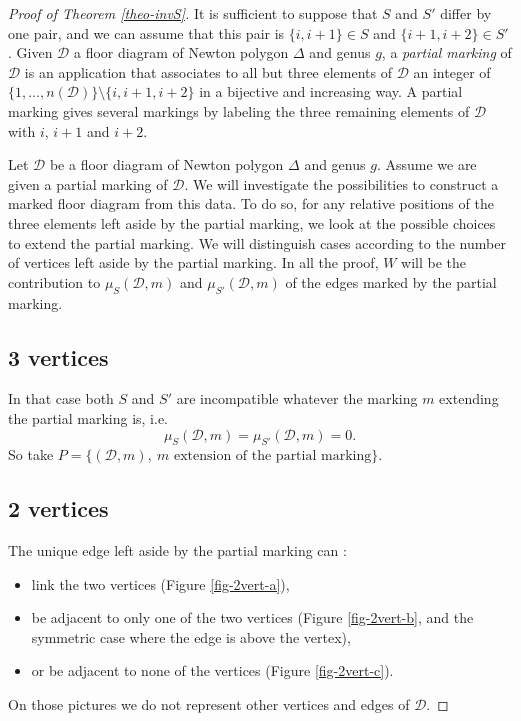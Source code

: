 \documentclass[11pt]{article}
\theoremstyle{definition}
\numberwithin{equation}{section}
\newcommand{\nocontentsline}[3]{}
\newcommand{\tocless}[2]{\bgroup\let\addcontentsline=\nocontentsline#1{#2}\egroup}
\newcommand{\D}{\mathcal{D}}
\newcommand{\muSDm}{\mu_S(\D,m)}
\newcommand{\muSSDm}{\mu_{S'}(\D,m)}
\theoremstyle{plain}
\begin{document}
\begin{proof}[Proof of Theorem \ref{theo-invS}]
It is sufficient to suppose that $S$ and $S'$ differ by one pair, and we can assume that this pair is $\{i,i+1\} \in S$ and $\{i+1,i+2\}\in S'$. 
Given $\D$ a floor diagram of Newton polygon $\Delta$ and genus $g$, a \emph{partial marking} of $\D$ is an application that associates to all but three elements of $\D$ an integer of $\{1,\dots,n(\D)\} \setminus \{i,i+1,i+2\}$ in a bijective and increasing way. A partial marking gives several markings by labeling the three remaining elements of $\D$ with $i$, $i+1$ and $i+2$. 

Let $\D$ be a floor diagram of Newton polygon $\Delta$ and genus $g$. Assume we are given a partial marking of $\D$. We will investigate the possibilities to construct a marked floor diagram from this data. To do so, for any relative positions of the three elements left aside by the partial marking, we look at the possible choices to extend the partial marking. We will distinguish cases according to the number of vertices left aside by the partial marking. In all the proof, $W$ will be the contribution to $\muSDm$ and $\muSSDm$ of the edges marked by the partial marking. 

\tocless{\subsection*{3 vertices}} 
 In that case both $S$ and $S'$ are incompatible whatever the marking $m$ extending the partial marking is, i.e.  
 \[ \muSDm = \muSSDm = 0.\]
 So take $P = \{(\D,m),\ m \text{ extension of the partial marking} \}$.


\tocless{\subsection*{2 vertices}}
The unique edge left aside by the partial marking can :
\begin{itemize}
    \item link the two vertices (Figure \ref{fig-2vert-a}),
    \item be adjacent to only one of the two vertices (Figure \ref{fig-2vert-b}, and the symmetric case where the edge is above the vertex),
    \item or be adjacent to none of the vertices (Figure \ref{fig-2vert-c}).
\end{itemize} 
On those pictures we do not represent other vertices and edges of $\D$. 


\end{proof}
\end{document}
